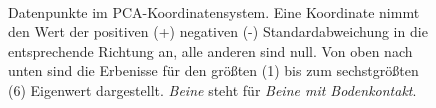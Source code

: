 \begin{figure}
   \\
   \qquad
   
   \caption{Datenpunkte im PCA-Koordinatensystem. Eine Koordinate nimmt den Wert der positiven (+) \bzw negativen (-) Standardabweichung in die entsprechende Richtung an, alle anderen sind null. Von oben nach unten sind die Erbenisse für den größten (1) bis zum sechstgrößten (6) Eigenwert dargestellt. \emph{Beine} steht für \emph{Beine mit Bodenkontakt}.}
   \label{pca_results_sqrtEV}
  \end{figure}
